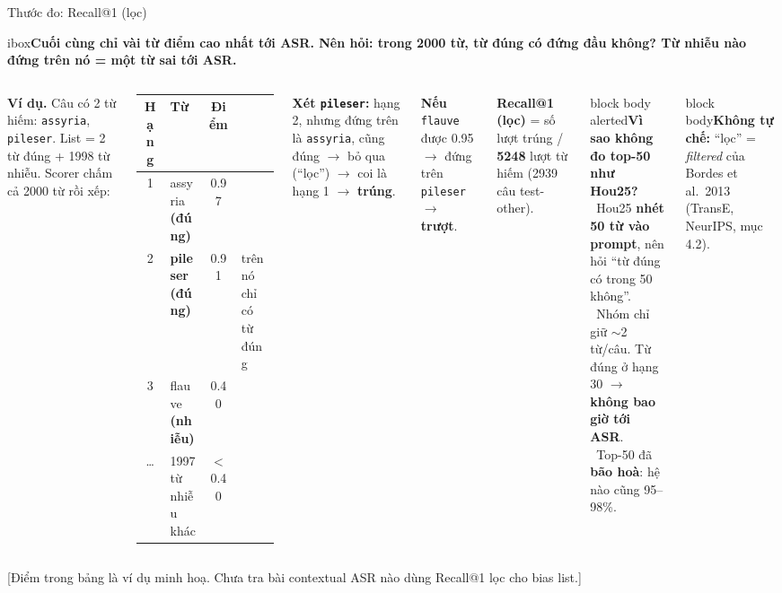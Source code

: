 \documentclass[aspectratio=169,xcolor=table]{beamer}
\newcommand{\bad}[1]{\textcolor{RiskRed}{\textbf{#1}}}
\newcommand{\good}[1]{\textcolor{GoodGreen}{\textbf{#1}}}
\newcommand{\src}[1]{\par\vfill{\tiny\color{TextGray}[#1]}}
\newcommand{\ra}{$\rightarrow$}
\newcommand{\nbox}[2][block body]{\begin{beamercolorbox}[sep=0.45em,rounded=true]{#1}\footnotesize #2\end{beamercolorbox}}
\newcommand{\nb}[1]{\textcolor{Accent}{#1}}
\newcommand{\insight}[1]{\begin{beamercolorbox}[sep=0.55em,rounded=true]{ibox}\small\bfseries #1\end{beamercolorbox}\vspace{0.15cm}}
\begin{document}
\begin{frame}{Thước đo: Recall@1 (lọc)}
\insight{Cuối cùng chỉ \nb{vài từ điểm cao nhất} tới ASR. Nên hỏi: trong 2000 từ, \nb{từ đúng có đứng đầu không?} Từ nhiễu nào đứng trên nó = một từ sai tới ASR.}
\begin{columns}[T]
{\scriptsize\textbf{Ví dụ.} Câu có 2 từ hiếm: \texttt{assyria}, \texttt{pileser}. List = 2 từ đúng + 1998 từ nhiễu. Scorer chấm cả 2000 từ rồi xếp:\par}
\vspace{0.05cm}
\renewcommand{\arraystretch}{1.0}\scriptsize\setlength{\tabcolsep}{3pt}
\begin{tabular}{clcl}
\toprule
Hạng & Từ & Điểm & \\
\midrule
1 & assyria \good{(đúng)} & 0.97 & \\
2 & \textbf{pileser} \good{(đúng)} & 0.91 & trên nó chỉ có từ đúng \\
3 & flauve \bad{(nhiễu)} & 0.40 & \\
\ldots & 1997 từ nhiễu khác & $<$0.40 & \\
\bottomrule
\end{tabular}
\par\vspace{0.08cm}
{\scriptsize\textbf{Xét \texttt{pileser}:} hạng 2, nhưng đứng trên là \texttt{assyria}, cũng đúng \ra{} bỏ qua (``lọc'') \ra{} coi là hạng 1 \ra{} \good{trúng}.\par
\textbf{Nếu} \texttt{flauve} được 0.95 \ra{} đứng trên \texttt{pileser} \ra{} \bad{trượt}.\par\vspace{0.04cm}
\textbf{Recall@1 (lọc)} = số lượt trúng / \textbf{5248} lượt từ hiếm (2939 câu test-other).\par}
\nbox[block body alerted]{\textbf{Vì sao không đo top-50 như Hou25?}\\[2pt]
\scriptsize\textbullet\ Hou25 \textbf{nhét 50 từ vào prompt}, nên hỏi ``từ đúng có trong 50 không''.\\[1pt]
\textbullet\ Nhóm chỉ giữ $\sim$2 từ/câu. Từ đúng ở hạng 30 \ra{} \bad{không bao giờ tới ASR}.\\[1pt]
\textbullet\ Top-50 đã \textbf{bão hoà}: hệ nào cũng 95--98\%.}
\vspace{0.1cm}
\nbox{\scriptsize\textbf{Không tự chế:} ``lọc'' = \textit{filtered} của Bordes et al.\ 2013 (TransE, NeurIPS, mục 4.2).}
\end{columns}
\src{Điểm trong bảng là ví dụ minh hoạ. Chưa tra bài contextual ASR nào dùng Recall@1 lọc cho bias list.}
\end{frame}
\end{document}
